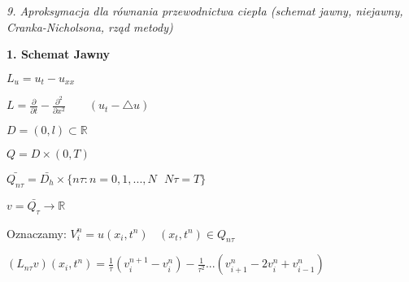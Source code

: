 \textit{9. Aproksymacja dla równania przewodnictwa ciepła (schemat jawny, niejawny, Cranka-Nicholsona, rząd metody)}

\textbf{1. Schemat Jawny}

$L_u = u_t - u_{xx}$

$L = \frac{\partial}{\partial t} - \frac{\partial^2}{\partial x^2}\ \ \ \ \ \ \ \ \ (u_t - \bigtriangleup u)$

$D = (0,l) \subset \mathbb{R}$

$Q = D \times (0,T)$

$\bar{Q_{n\tau}} = \bar{D_h} \times \{ n\tau : n = 0, 1, ..., N\ \ \ N\tau = T\}$

$v = \bar{Q_\tau} \rightarrow \mathbb{R}$

Oznaczamy: $V^n_i = u(x_i,t^n)\ \ \ \ (x_t,t^n) \in Q_{n\tau}$

$(L_{n\tau} v)(x_i, t^n) = \frac{1}{\tau} (v^{n+1}_i - v^n_i) - \frac{1}{\tau^2} ... (v^n_{i+1} - 2v^n_i + v^n_{i-1})$